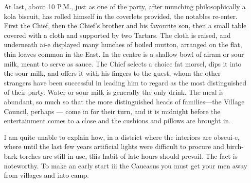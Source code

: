 \documentclass[25pt, a4paper]{article}
\begin{document}
	At last, about 10 P.M., just as one of the party, after munching philosophically a kola biscuit, has rolled himself in the coverlets provided, the notables re-enter. First the Chief, then the Chief's brother and his favourite son, then a small table covered with a cloth and supported by two Tartars. The cloth is raised, and underneath ai-e displayed many hunches of boiled mutton, arranged on the flat, thin loaves common in the East. In the centre is a shallow bowl of airam or sour milk, meant to serve as sauce. The Chief selects a choice fat morsel, dips it into the sour milk, and offers it with his fingers to the guest, whom the other strangers have been successful in leading him to regard as the most distinguished of their party. Water or sour milk is generally the only drink. The meal is abundant, so much so that the more distinguished heads of families—the Village Council, perhaps — come in for their turn, and it is midnight before the entertainment comes to a close and the cushions and pillows are brought in.
	
	I am quite unable to explain how, in a district where the interiors are obscui-e, where until the last few years artificial lights were difficult to procure and birch-bark torches are still in use, tliis habit of late hours should prevail. The fact is noteworthy. To make an early start iii the Caucasus you must get your men away from villages and into camp.
	
\end{document}
